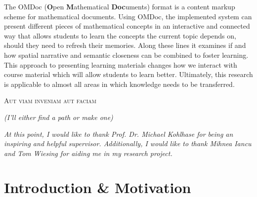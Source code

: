 \documentclass[twoside, 12pt]{article}
\begin{document}
The OMDoc (\textbf{O}pen \textbf{M}athematical \textbf{Doc}uments) format \cite{Kohlhase:OMDoc1.2} is a content markup scheme for mathematical documents. Using OMDoc, the implemented system can present different pieces of mathematical concepts in an interactive and connected way that allows students to learn the concepts the current topic depends on, should they need to refresh their memories. Along these lines it examines if and how spatial narrative and semantic closeness can be combined to foster learning. This approach to presenting learning materials changes how we interact with course material which will allow students to learn better. Ultimately, this research is applicable to almost all areas in which knowledge needs to be transferred.\\ 

\newpage
\tableofcontents

\clearpage

\newpage
\thispagestyle{empty}
\vspace*{\fill}
\begin{center}
\textsc{Aut viam inveniam aut faciam}\\

\vspace*{1cm}

\textit{(I'll either find a path or make one)}\\

\vspace*{4cm}

\centering

\begin{quoting}
\begin{center}
\noindent
\textit{At this point, I would like to thank Prof. Dr. Michael Kohlhase for being an inspiring and helpful supervisor. Additionally, I would like to thank Mihnea Iancu and Tom Wiesing for aiding me in my research project.\\}
\end{center}
\end{quoting}

\vspace*{\fill}
\end{center}

\newpage
{}

\section{Introduction \& Motivation}
\label{sec:introduction}
\end{document}
